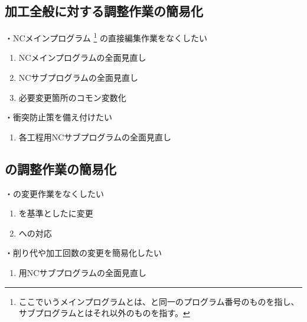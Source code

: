 \clearpage


\subsection{加工全般に対する調整作業の簡易化}
・NCメインプログラム
\footnote{ここでいうメインプログラムとは、\DrawingNumber と同一のプログラム番号のものを指し、サブプログラムとはそれ以外のものを指す。}
の直接編集作業をなくしたい
\begin{enumerate}[label=\sarrow]
\item {}NCメインプログラムの全面見直し
\item {}NCサブプログラムの全面見直し
\item 必要変更箇所のコモン変数化
\end{enumerate}
・衝突防止策を備え付けたい
\begin{enumerate}[label=\sarrow]
\item 各工程用NCサブプログラムの全面見直し
\end{enumerate}



\subsection{\EndFacecutMilling の調整作業の簡易化}
・\TDCorrection の変更作業をなくしたい
\begin{enumerate}[label=\sarrow]
\item \IDCenter を基準とした\EndFacecutMilling に変更
\item \ODCornerR への対応
\end{enumerate}
・削り代や加工回数の変更を簡易化したい
\begin{enumerate}[label=\sarrow]
\item \EndFacecutMilling 用NCサブプログラムの全面見直し
\end{enumerate}


